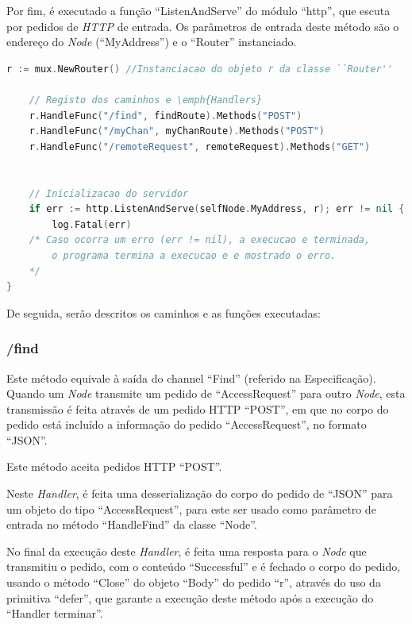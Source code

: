 Por fim, é executado a função ``ListenAndServe'' do módulo ``http'', que escuta por pedidos de \emph{HTTP} de entrada.
Os parâmetros de entrada deste método são o endereço do \emph{Node} (``MyAddress'') e o ``Router'' instanciado.


\begin{lstlisting}[caption={Método/transformação ``WaiterWithRequest''},language=Go]
	r := mux.NewRouter() //Instanciacao do objeto r da classe ``Router''

	// Registo dos caminhos e \emph{Handlers}
	r.HandleFunc("/find", findRoute).Methods("POST")
	r.HandleFunc("/myChan", myChanRoute).Methods("POST")
	r.HandleFunc("/remoteRequest", remoteRequest).Methods("GET")


	// Inicializacao do servidor
	if err := http.ListenAndServe(selfNode.MyAddress, r); err != nil {
		log.Fatal(err) 				
	/* Caso ocorra um erro (err != nil), a execucao e terminada, 
		o programa termina a execucao e e mostrado o erro.
	*/
}
\end{lstlisting}




De seguida, serão descritos os caminhos e as funções executadas:

\subsubsection*{/find}
Este método equivale à saída do channel ``Find'' (referido na Especificação).
Quando um \emph{Node} transmite um pedido de ``AccessRequest'' para outro \emph{Node},
esta transmissão é feita através de um pedido \acs{HTTP} ``POST'', em que no corpo 
do pedido está incluído a informação do pedido ``AccessRequest'', no formato ``JSON''.

Este método aceita pedidos \acs{HTTP} ``POST''.

Neste \emph{Handler}, é feita uma desserialização do corpo do pedido de ``JSON'' para um objeto
do tipo ``AccessRequest'', para este ser usado como parâmetro de entrada no método ``HandleFind''
da classe ``Node''.

No final da execução deste \emph{Handler}, é feita uma resposta para o \emph{Node} que transmitiu o pedido, com o conteúdo ``Successful''
e é fechado o corpo do pedido, usando o método ``Close'' do objeto ``Body'' do pedido ``r'',
através do uso da primitiva ``defer'', que garante a execução deste método após a execução do ``Handler terminar''.

